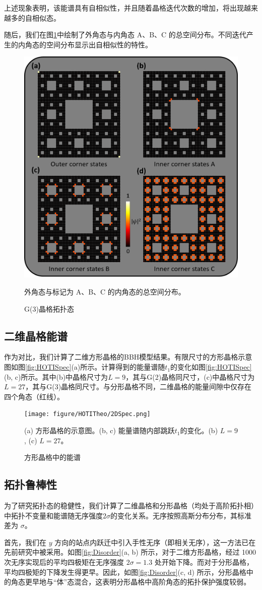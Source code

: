 上述现象表明，该能谱具有自相似性，并且随着晶格迭代次数的增加，将出现越来越多的自相似态。

随后，我们在图\ref{fig:G2Field}中绘制了外角态与内角态 A、B、C 的总空间分布。不同迭代产生的内角态的空间分布显示出自相似性的特性。

\begin{figure}[htbp]
    \centering
    \includegraphics[width=0.5\linewidth]{figure/HOTITheo/G2Field.png}
    \caption{G(3)晶格拓扑态}外角态与标记为 A、B、C 的内角态的总空间分布。
    \label{fig:G2Field}
\end{figure}

\subsection{二维晶格能谱}
作为对比，我们计算了二维方形晶格的BBH模型结果。有限尺寸的方形晶格示意图如图\ref{fig:HOTISpec}(a)所示。计算得到的能量谱随$t_1$的变化如图\ref{fig:HOTISpec}(b, c)所示。其中(b)中晶格尺寸为$L=9$，其与G(2)晶格同尺寸，(c)中晶格尺寸为$L=27$，其与G(3)晶格同尺寸。与分形晶格不同，二维晶格的能量间隙中仅存在四个角态（红线）。
\begin{figure}[htbp]
    \centering
    \texttt{[image: figure/HOTITheo/2DSpec.png]}
    \caption{方形晶格中的能谱}(a) 方形晶格的示意图。(b, c) 能量谱随内部跳跃$t_1$的变化。(b) $L=9$, (c) $L=27$。
    \label{fig:2DSpec}
\end{figure}

\subsection{拓扑鲁棒性}
为了研究拓扑态的稳健性，我们计算了二维晶格和分形晶格（均处于高阶拓扑相）中拓扑不变量和能谱随无序强度$ 2\sigma $的变化关系。无序按照高斯分布分布，其标准差为 $ \sigma $。

首先，我们在 $ y $ 方向的站点内跃迁中引入手性无序（即相关无序），这一方法已在先前研究中被采用\cite{li2020topological}。如图\ref{fig:Disorder}(a, b) 所示，对于二维方形晶格，经过 1000 次无序实现后的平均四极矩在无序强度 \( 2\sigma = 1.3 \) 处开始下降。而对于分形晶格，平均四极矩的下降发生得更早。因此，如图\ref{fig:Disorder}(c, d) 所示，分形晶格中的角态更早地与“体”态混合，这表明分形晶格中高阶角态的拓扑保护强度较弱。

